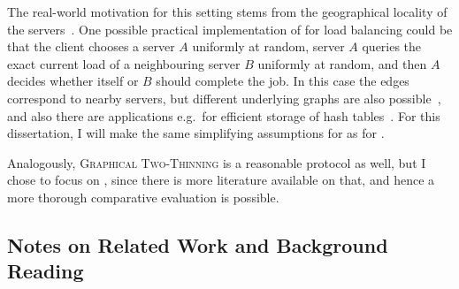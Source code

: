 The real-world motivation for this setting stems from the geographical locality of the servers~\cite{krishnaram2006graphicaltwochoiceoriginal}. One possible practical implementation of \GraphicalTwoChoice for load balancing could be that the client chooses a server $A$ uniformly at random, server $A$ queries the exact current load of a neighbouring server $B$ uniformly at random, and then $A$ decides whether itself or $B$ should complete the job. In this case the edges correspond to nearby servers, but different underlying graphs are also possible~\cite{peres2015oneplusbeta}, and also there are applications e.g.\ for efficient storage of hash tables~\cite{krishnaram2006graphicaltwochoiceoriginal}. For this dissertation, I will make the same simplifying assumptions for \GraphicalTwoChoice as for \TwoThinning. 


Analogously, \textsc{Graphical Two-Thinning} is a reasonable protocol as well, but I chose to focus on \GraphicalTwoChoice, since there is more literature available on that, and hence a more thorough comparative evaluation is possible.\\

\subsection{Notes on Related Work and Background Reading}

